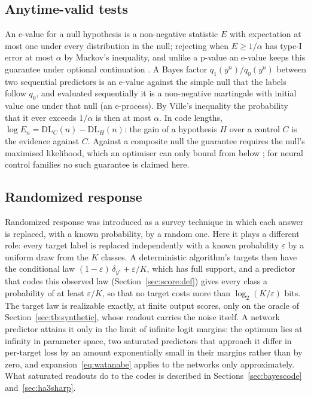 \documentclass[11pt,a4paper]{article}
\newcommand{\DL}{\mathrm{DL}}
\begin{document}
\subsection{Anytime-valid tests}
\label{sec:bg:evalues}

An e-value for a null hypothesis is a non-negative statistic $E$ with expectation at most one under every distribution in the null; rejecting when $E\ge1/\alpha$ has type-I error at most $\alpha$ by Markov's inequality, and unlike a p-value an e-value keeps this guarantee under optional continuation \cite{grunwald2024safe,ramdas2023}. A Bayes factor $q_1(y^n)/q_0(y^n)$ between two sequential predictors is an e-value against the simple null that the labels follow $q_0$, and evaluated sequentially it is a non-negative martingale with initial value one under that null (an e-process). By Ville's inequality \cite{ville1939} the probability that it ever exceeds $1/\alpha$ is then at most $\alpha$. In code lengths, $\log E_n=\DL_C(n)-\DL_H(n)$: the gain of a hypothesis $H$ over a control $C$ is the evidence against $C$. Against a composite null the guarantee requires the null's maximised likelihood, which an optimiser can only bound from below \cite{wasserman2020}; for neural control families no such guarantee is claimed here.

\subsection{Randomized response}
\label{sec:bg:rr}

Randomized response \cite{warner1965} was introduced as a survey technique in which each answer is replaced, with a known probability, by a random one. Here it plays a different role: every target label is replaced independently with a known probability $\varepsilon$ by a uniform draw from the $K$ classes. A deterministic algorithm's targets then have the conditional law $(1-\varepsilon)\,\delta_{y^*}+\varepsilon/K$, which has full support, and a predictor that codes this observed law (Section~\ref{sec:score:def}) gives every class a probability of at least $\varepsilon/K$, so that no target costs more than $\log_2(K/\varepsilon)$ bits. The target law is realizable exactly, at finite output scores, only on the oracle of Section~\ref{sec:tb:synthetic}, whose readout carries the noise itself. A network predictor attains it only in the limit of infinite logit margins: the optimum lies at infinity in parameter space, two saturated predictors that approach it differ in per-target loss by an amount exponentially small in their margins rather than by zero, and expansion~\eqref{eq:watanabe} applies to the networks only approximately. What saturated readouts do to the codes is described in Sections~\ref{sec:bayescode} and~\ref{sec:ha3sharp}.
\end{document}
